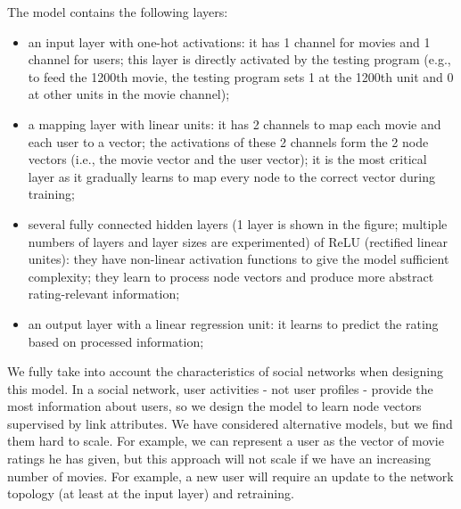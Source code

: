 \documentclass[twocolumn]{article}
\begin{document}
The model contains the following layers:
\begin{itemize}
	\item an input layer with one-hot activations: it has 1 channel for movies 
	and 1 channel for users;
	this layer is directly activated by the testing program (e.g., to feed the 
	1200th movie, the testing program sets 1 at the 1200th unit and 0 at other 	
	units in the movie channel);
	\item a mapping layer with linear units: it has 2 channels to map each 
	movie and each user to a vector;
	the activations of these 2 channels form the 2 node vectors (i.e., the 
	movie vector and the user vector);
	it is the most critical layer as it gradually learns to map every node to 
	the correct vector during training;
	\item several fully connected hidden layers (1 layer is shown in the figure;
	multiple numbers of layers and layer sizes are experimented) of ReLU 
	(rectified linear unites):
	they have non-linear activation functions to give the model sufficient 
	complexity;
	they learn to process node vectors and produce more abstract 
	rating-relevant information;
	\item an output layer with a linear regression unit: it learns to predict 
	the rating based on processed information;
\end{itemize}
We fully take into account the characteristics of social networks when 
designing this model.
In a social network, user activities - not user profiles - provide the most 
information about users, so we design the model to learn node vectors 
supervised by link attributes.
We have considered alternative models, but we find them hard to scale.
For example, we can represent a user as the vector of movie ratings he has 
given, 
but this approach will not scale if we have an increasing number of movies.
For example, a new user will require an update to the network topology (at 
least at the input layer) and retraining.
\end{document}
